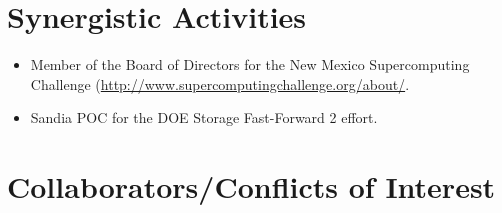 \documentclass[11pt]{article}
\begin{document}
\vspace{-0.75em}
\section*{Synergistic Activities}
\vspace{-0.75em}
\begin{itemize}
\item Member of the Board of Directors for the New Mexico Supercomputing Challenge (\url{http://www.supercomputingchallenge.org/about/}.
\item Sandia POC for the DOE Storage Fast-Forward 2 effort.
\end{itemize}
\section*{Collaborators/Conflicts of Interest}
\iffalse
\end{document}
